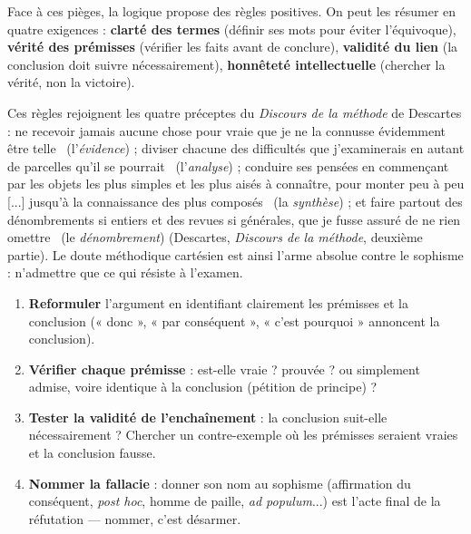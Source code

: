 \documentclass[11pt]{article}
\newcounter{popsec}
\newcounter{popsub}
\newcommand{\courssub}[1]{%
  \stepcounter{popsub}%
  \par\vspace{9pt}\noindent{\popxbold\fontsize{11.5}{13}\selectfont\color{popink}{\color{poporange}\thepopsec.\thepopsub}\hspace{6pt}#1}\par\nopagebreak\vspace{4pt}
}
\begin{document}
\courssub{Les règles du bon raisonnement}

Face à ces pièges, la logique propose des règles positives. On peut les résumer en quatre exigences : \textbf{clarté des termes} (définir ses mots pour éviter l'équivoque), \textbf{vérité des prémisses} (vérifier les faits avant de conclure), \textbf{validité du lien} (la conclusion doit suivre nécessairement), \textbf{honnêteté intellectuelle} (chercher la vérité, non la victoire).

Ces règles rejoignent les quatre préceptes du \emph{Discours de la méthode} de Descartes : \guillemotleft ne recevoir jamais aucune chose pour vraie que je ne la connusse évidemment être telle \guillemotright\ (l'\emph{évidence}) ; \guillemotleft diviser chacune des difficultés que j'examinerais en autant de parcelles qu'il se pourrait \guillemotright\ (l'\emph{analyse}) ; conduire ses pensées \guillemotleft en commençant par les objets les plus simples et les plus aisés à connaître, pour monter peu à peu [...] jusqu'à la connaissance des plus composés \guillemotright\ (la \emph{synthèse}) ; et \guillemotleft faire partout des dénombrements si entiers et des revues si générales, que je fusse assuré de ne rien omettre \guillemotright\ (le \emph{dénombrement}) (Descartes, \emph{Discours de la méthode}, deuxième partie). Le doute méthodique cartésien est ainsi l'arme absolue contre le sophisme : n'admettre que ce qui résiste à l'examen.

\begin{methode}
\begin{enumerate}
  \item \textbf{Reformuler} l'argument en identifiant clairement les prémisses et la conclusion (« donc », « par conséquent », « c'est pourquoi » annoncent la conclusion).
  \item \textbf{Vérifier chaque prémisse} : est-elle vraie ? prouvée ? ou simplement admise, voire identique à la conclusion (pétition de principe) ?
  \item \textbf{Tester la validité de l'enchaînement} : la conclusion suit-elle nécessairement ? Chercher un contre-exemple où les prémisses seraient vraies et la conclusion fausse.
  \item \textbf{Nommer la fallacie} : donner son nom au sophisme (affirmation du conséquent, \emph{post hoc}, homme de paille, \emph{ad populum}...) est l'acte final de la réfutation — nommer, c'est désarmer.
\end{enumerate}
\end{methode}
\end{document}
